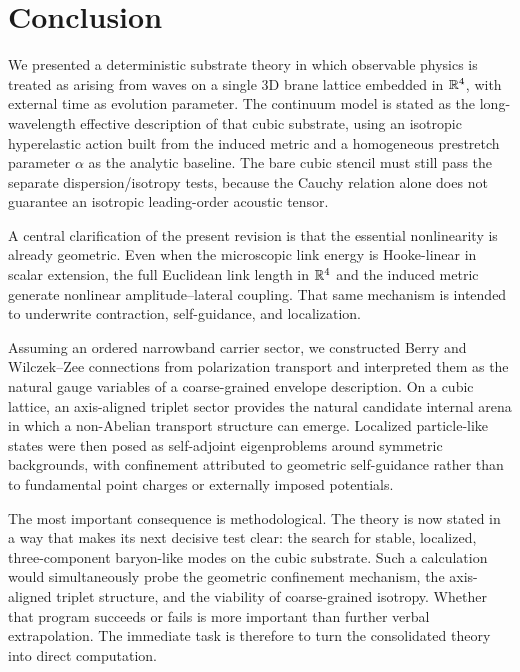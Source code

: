 \section{Conclusion}
\label{sec:conclusion}

We presented a deterministic substrate theory in which observable physics is treated as arising from waves on a single
3D brane lattice embedded in $\mathbb{R}^4$, with external time as evolution parameter.
The continuum model is stated as the long-wavelength effective description of that cubic substrate, using an isotropic
hyperelastic action built from the induced metric and a homogeneous prestretch parameter $\alpha$ as the analytic
baseline. The bare cubic stencil must still pass the separate dispersion/isotropy tests, because the Cauchy relation
alone does not guarantee an isotropic leading-order acoustic tensor.

A central clarification of the present revision is that the essential nonlinearity is already geometric.
Even when the microscopic link energy is Hooke-linear in scalar extension, the full Euclidean link length in $\mathbb{R}^4$
and the induced metric generate nonlinear amplitude--lateral coupling.
That same mechanism is intended to underwrite contraction, self-guidance, and localization.

Assuming an ordered narrowband carrier sector, we constructed Berry and Wilczek--Zee connections from polarization
transport and interpreted them as the natural gauge variables of a coarse-grained envelope description.
On a cubic lattice, an axis-aligned triplet sector provides the natural candidate internal arena in which a non-Abelian
transport structure can emerge.
Localized particle-like states were then posed as self-adjoint eigenproblems around symmetric backgrounds, with
confinement attributed to geometric self-guidance rather than to fundamental point charges or externally imposed
potentials.

The most important consequence is methodological.
The theory is now stated in a way that makes its next decisive test clear: the search for stable, localized,
three-component baryon-like modes on the cubic substrate.
Such a calculation would simultaneously probe the geometric confinement mechanism, the axis-aligned triplet structure,
and the viability of coarse-grained isotropy.
Whether that program succeeds or fails is more important than further verbal extrapolation.
The immediate task is therefore to turn the consolidated theory into direct computation.

